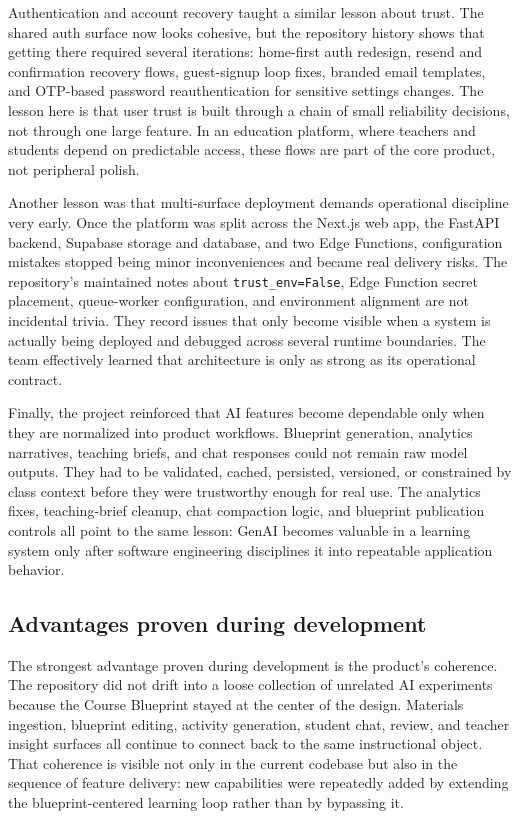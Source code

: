\documentclass[11pt,a4paper]{article}
\begin{document}
Authentication and account recovery taught a similar lesson about trust. The shared auth surface now
looks cohesive, but the repository history shows that getting there required several iterations:
home-first auth redesign, resend and confirmation recovery flows, guest-signup loop fixes, branded
email templates, and OTP-based password reauthentication for sensitive settings changes. The lesson
here is that user trust is built through a chain of small reliability decisions, not through one
large feature. In an education platform, where teachers and students depend on predictable access,
these flows are part of the core product, not peripheral polish.

Another lesson was that multi-surface deployment demands operational discipline very early. Once the
platform was split across the Next.js web app, the FastAPI backend, Supabase storage and database,
and two Edge Functions, configuration mistakes stopped being minor inconveniences and became real
delivery risks. The repository's maintained notes about \texttt{trust\_env=False}, Edge Function
secret placement, queue-worker configuration, and environment alignment are not incidental trivia.
They record issues that only become visible when a system is actually being deployed and debugged
across several runtime boundaries. The team effectively learned that architecture is only as strong
as its operational contract.

Finally, the project reinforced that AI features become dependable only when they are normalized
into product workflows. Blueprint generation, analytics narratives, teaching briefs, and chat
responses could not remain raw model outputs. They had to be validated, cached, persisted,
versioned, or constrained by class context before they were trustworthy enough for real use. The
analytics fixes, teaching-brief cleanup, chat compaction logic, and blueprint publication controls
all point to the same lesson: GenAI becomes valuable in a learning system only after software
engineering disciplines it into repeatable application behavior.

\subsection{Advantages proven during development}

The strongest advantage proven during development is the product's coherence. The repository did not
drift into a loose collection of unrelated AI experiments because the Course Blueprint stayed at the
center of the design. Materials ingestion, blueprint editing, activity generation, student chat,
review, and teacher insight surfaces all continue to connect back to the same instructional object.
That coherence is visible not only in the current codebase but also in the sequence of feature
delivery: new capabilities were repeatedly added by extending the blueprint-centered learning loop
rather than by bypassing it.
\end{document}

